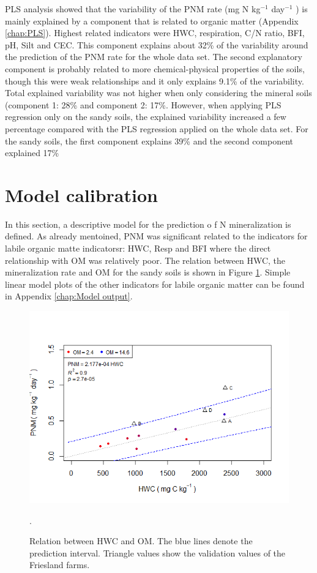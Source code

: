 \documentclass[10pt,twoside,dutch,english]{report}
\begin{document}
PLS analysis showed that the variability of the PNM rate (mg N kg$^{-1} $ day$^{-1}$ ) is mainly explained by a component that is related to organic matter (Appendix \ref{chap:PLS}). Highest related indicators were HWC, respiration, C/N ratio, BFI, pH, Silt and CEC. This component explains about 32\% of the variability around the prediction of the PNM rate for the whole data set. The second explanatory component is probably related to more chemical-physical properties of the soils, though this were weak relationships and it only explains 9.1\% of the variability.  Total explained variability was not higher when only considering the mineral soils (component 1: 28\% and component 2: 17\%. However, when applying PLS regression only on the sandy soils, the explained variability increased a few percentage compared with the PLS regression applied on the whole data set. For the sandy soils, the first component explains 39\% and the second component explained 17\% 

\section{Model calibration}
In this section, a descriptive model for the prediction o f N mineralization is defined. As already mentoined, PNM was significant related to the indicators for labile organic matte indicatorsr: HWC, Resp and BFI where the direct relationship with OM was relatively poor. The relation between HWC, the mineralization rate and OM for the sandy soils is shown in Figure \ref{fig:results_pnm_hwc}.  Simple linear model plots of the other indicators for labile organic matter can be found in Appendix \ref{chap:Model output}.

	\begin{figure}[h] %
	\centering
	\includegraphics[width=0.7\linewidth]{results_pnm_hwc}
	\caption{Relation between HWC and OM.  The blue lines denote the prediction interval. Triangle values show the validation values of the Friesland farms.}.
	\label{fig:results_pnm_hwc}
\end{figure}
\end{document}
